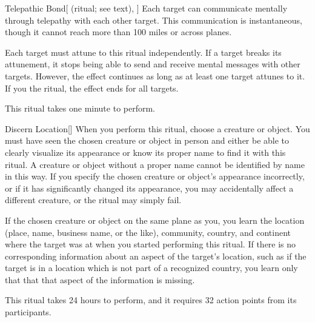 \lowercase{\hypertarget{spell:Telepathic Bond}{}}\label{spell:Telepathic Bond}
\begin{attuneability}[Rank 4]{\hypertarget{spell:Telepathic Bond}{Telepathic Bond}}[ (ritual; see text), ]
Each target can communicate mentally through telepathy with each other target.
This communication is instantaneous, though it cannot reach more than 100 miles or across planes.

Each target must attune to this ritual independently.
If a target breaks its attunement, it stops being able to send and receive mental messages with other targets.
However, the effect continues as long as at least one target attunes to it.
If you  the ritual, the effect ends for all targets.

This ritual takes one minute to perform.
\end{attuneability}
\vspace{0.25em}



\lowercase{\hypertarget{spell:Discern Location}{}}\label{spell:Discern Location}
\begin{apability}[Rank 5]{\hypertarget{spell:Discern Location}{Discern Location}}[]
\targetrule
When you perform this ritual, choose a creature or object.
You must have seen the chosen creature or object in person and either be able to clearly visualize its appearance or know its proper name to find it with this ritual.
A creature or object without a proper name cannot be identified by name in this way.
If you specify the chosen creature or object's appearance incorrectly, or if it has significantly changed its appearance, you may accidentally affect a different creature, or the ritual may simply fail.

If the chosen creature or object on the same plane as you, you learn the location (place, name, business name, or the like), community, country, and continent where the target was at when you started performing this ritual.
If there is no corresponding information about an aspect of the target's location, such as if the target is in a location which is not part of a recognized country,
you learn only that that that aspect of the information is missing.

This ritual takes 24 hours to perform, and it requires 32 action points from its participants.
\end{apability}
\vspace{0.25em}



